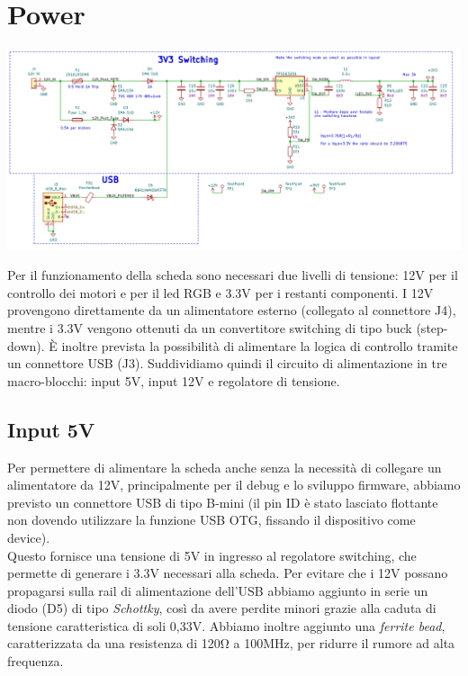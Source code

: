 \hypertarget{power}{%
\section{Power}\label{power}}

\begin{center}
\includegraphics[scale=0.45]{figures/image65.png}
\captionsetup{type=figure}
\end{center}

\noindent Per il funzionamento della scheda sono necessari due livelli di tensione: 
12V per il controllo dei motori e per il led RGB e 3.3V per i restanti componenti. 
I 12V provengono direttamente da un alimentatore esterno (collegato al connettore J4), 
mentre i 3.3V vengono ottenuti da un convertitore switching di tipo buck (step-down). 
È inoltre prevista la possibilità di alimentare la logica di controllo tramite un connettore USB (J3). 
Suddividiamo quindi il circuito di alimentazione in tre macro-blocchi: input 5V, input 12V e regolatore di tensione.

\hypertarget{input-5V}{
\subsection{\texorpdfstring{Input 5V}{Input 5V}}\label{input-5V}}

Per permettere di alimentare la scheda anche senza la necessità di collegare un 
alimentatore da 12V, principalmente per il debug e lo sviluppo firmware, abbiamo 
previsto un connettore USB di tipo B-mini (il pin ID è stato lasciato flottante non 
dovendo utilizzare la funzione USB OTG, fissando il dispositivo come device).\\
Questo fornisce una tensione di 5V in ingresso al regolatore switching, che permette di generare i 3.3V 
necessari alla scheda. Per evitare che i 12V possano propagarsi sulla rail di alimentazione dell’USB abbiamo 
aggiunto in serie un diodo (D5) di tipo \emph{Schottky}, così da avere perdite minori grazie alla caduta di tensione 
caratteristica di soli 0,33V.
Abbiamo inoltre aggiunto una \emph{ferrite bead}, caratterizzata da una resistenza di 120Ω a 100MHz, per
ridurre il rumore ad alta frequenza.

